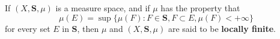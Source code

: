 If $(X, \mathbf{S}, \mu)$ is a measure space, and if $\mu$ has the property that
$$\mu(E) = \sup \{ \mu(F) : F \in \mathbf{S}, F \subset E, \mu(F) < +\infty \}$$
for every set $E$ in $\mathbf{S}$, then $\mu$ and $(X, \mathbf{S}, \mu)$ are said to be \textbf{locally finite}.
